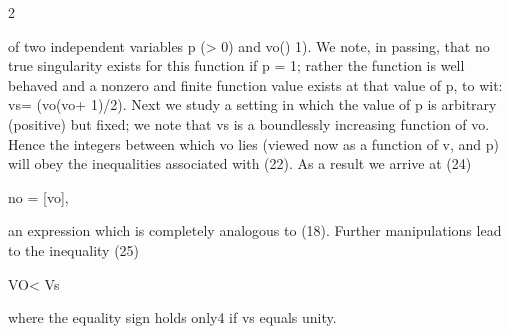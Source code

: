 \documentclass[10pt]{article}
\begin{document}
\begin{ReviewVerbatim}
2

of two independent variables p (> 0) and vo() 1). We note, in passing, that no true
singularity exists for this function if p = 1; rather the function is well behaved and
a nonzero and finite function value exists at that value of p, to wit: vs= (vo(vo+ 1)/2).
Next we study a setting in which the value of p is arbitrary (positive) but fixed; we
note that vs is a boundlessly increasing function of vo. Hence the integers between
which vo lies (viewed now as a function of v, and p) will obey the inequalities associated with (22). As a result we arrive at
(24)

no = [vo],

an expression which is completely analogous to (18). Further manipulations lead
to the inequality
(25)

VO< Vs

where the equality sign holds only4 if vs equals unity.
\end{ReviewVerbatim}
\end{document}
